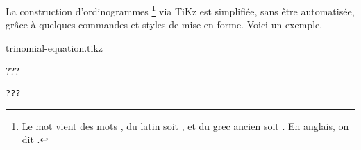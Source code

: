 La construction d'ordinogrammes
\footnote{
	Le mot  vient des mots , du latin  soit , et du grec ancien  soit .
	En anglais, on dit .
}
via TiKz est simplifiée, sans être automatisée, grâce à quelques commandes et styles de mise en forme. Voici un exemple.

\begin{frame-gene}[Résolution de {$a x^2 + b x + c = 0$} si $a \neq 0$]
	\begin{center}
		{trinomial-equation.tikz}
	\end{center}
\end{frame-gene}


???

\begin{frame-gene}
    \small
    \begin{verbatim}
???
	\end{verbatim}
\end{frame-gene}
